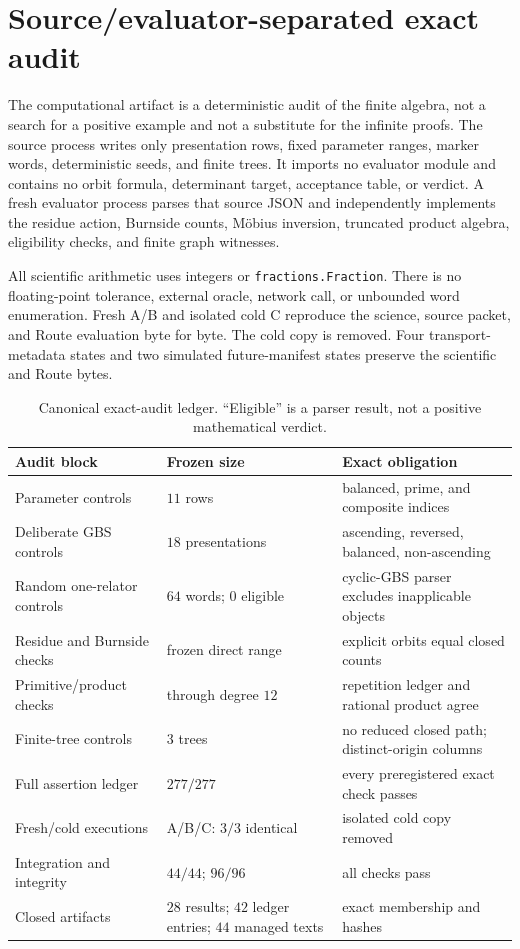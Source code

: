 \section{Source/evaluator-separated exact audit}
\label{sec:exact-audit}

The computational artifact is a deterministic audit of the finite algebra,
not a search for a positive example and not a substitute for the infinite
proofs.  The source process writes only presentation rows, fixed parameter
ranges, marker words, deterministic seeds, and finite trees.  It imports no
evaluator module and contains no orbit formula, determinant target,
acceptance table, or verdict.  A fresh evaluator process parses that source
JSON and independently implements the residue action, Burnside counts,
M\"obius inversion, truncated product algebra, eligibility checks, and finite
graph witnesses.

All scientific arithmetic uses integers or \texttt{fractions.Fraction}.
There is no floating-point tolerance, external oracle, network call, or
unbounded word enumeration.  Fresh A/B and isolated cold C reproduce the
science, source packet, and Route evaluation byte for byte.  The cold copy is
removed.  Four transport-metadata states and two simulated future-manifest
states preserve the scientific and Route bytes.

\begin{table}[t]
\centering
\small
\caption{Canonical exact-audit ledger.  ``Eligible'' is a parser result, not a
positive mathematical verdict.}
\label{tab:exact-audit}
\begin{tabularx}{\textwidth}{L{4.1cm}L{2.7cm}Y}
\toprule
Audit block & Frozen size & Exact obligation \\
\midrule
Parameter controls & $11$ rows & balanced, prime, and composite indices \\
Deliberate GBS controls & $18$ presentations & ascending, reversed,
balanced, non-ascending \\
Random one-relator controls & $64$ words; $0$ eligible & cyclic-GBS parser
excludes inapplicable objects \\
Residue and Burnside checks & frozen direct range & explicit orbits equal
closed counts \\
Primitive/product checks & through degree $12$ & repetition ledger and
rational product agree \\
Finite-tree controls & $3$ trees & no reduced closed path; distinct-origin
columns \\
Full assertion ledger & $277/277$ & every preregistered exact check passes \\
Fresh/cold executions & A/B/C: $3/3$ identical & isolated cold copy removed \\
Integration and integrity & $44/44$; $96/96$ & all checks pass \\
Closed artifacts & $28$ results; $42$ ledger entries; $44$ managed texts &
exact membership and hashes \\
\bottomrule
\end{tabularx}
\end{table}

